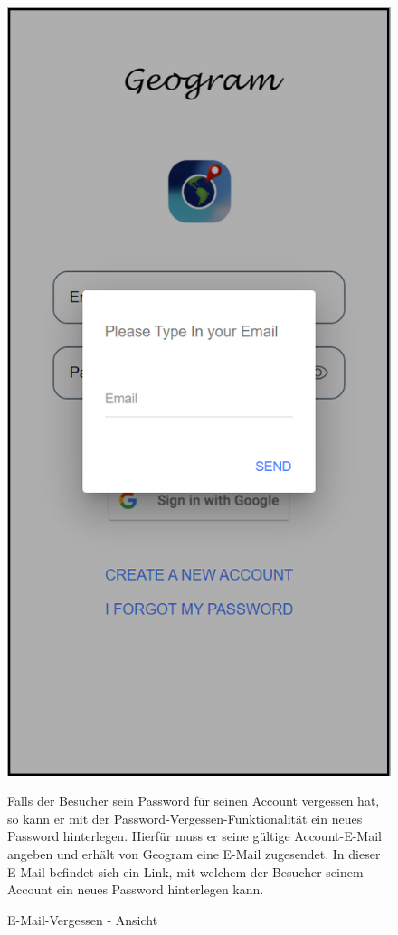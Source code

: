 \begin{figure}[H]
    \centering
    \begin{minipage}{.4\textwidth}
        \begin{center}
            \includegraphics[width=0.8\linewidth]{images/forgetemail.png}
        \end{center}
        \caption{E-Mail-Vergessen - Ansicht}
        \label{fig:forgetemail}
    \end{minipage}%
    \begin{minipage}{.6\textwidth}
        \begin{changemargin}{0.5cm}{0cm}            
            Falls der Besucher sein Password für seinen Account vergessen hat, so kann er mit der \glqq Password-Vergessen\grqq{}-Funktionalität ein neues Password hinterlegen. Hierfür muss er seine gültige Account-E-Mail angeben und erhält von Geogram eine E-Mail zugesendet. In dieser E-Mail befindet sich ein Link, mit welchem der Besucher seinem Account ein neues Password hinterlegen kann.
        \end{changemargin}
    \end{minipage}
\end{figure}

